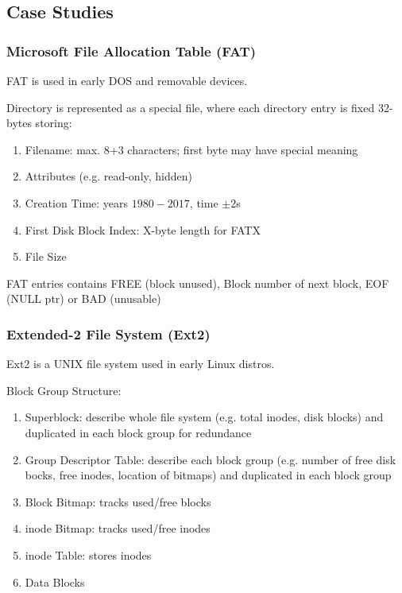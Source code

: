 \documentclass[12pt, a4paper]{article}
\begin{document}
\begin{multicols*}{3}
\colbreak
\subsection{Case Studies}
\subsubsection{Microsoft File Allocation Table (FAT)}
FAT is used in early DOS and removable devices.

{\centering{}\par}
Directory is represented as a special file, where each directory entry is fixed 32-bytes storing:
\begin{enumerate}[\roman*.]
  \item Filename: max. 8+3 characters; first byte may have special meaning
  \item Attributes (e.g. read-only, hidden)
  \item Creation Time: years $1980-2017$, time $\pm 2$s
  \item First Disk Block Index: X-byte length for FATX 
  \item File Size
\end{enumerate}

{\centering{}\par}

FAT entries contains FREE (block unused), Block number of next block, EOF (NULL ptr) or BAD (unusable)

{\centering{}\par}
\vspace{-1em}
\subsubsection{Extended-2 File System (Ext2)}
Ext2 is a UNIX file system used in early Linux distros.

{\centering{}\par}

Block Group Structure:
\begin{enumerate}[\roman*.]
  \item Superblock: describe whole file system (e.g. total inodes, disk blocks) and duplicated in each block group for redundance 
  \item Group Descriptor Table: describe each block group (e.g. number of free disk bocks, free inodes, location of bitmaps) and duplicated in each block group
  \item Block Bitmap: tracks used/free blocks
  \item inode Bitmap: tracks used/free inodes
  \item inode Table: stores inodes
  \item Data Blocks
\end{enumerate}
\colbreak 


\end{multicols*}
\end{document}
